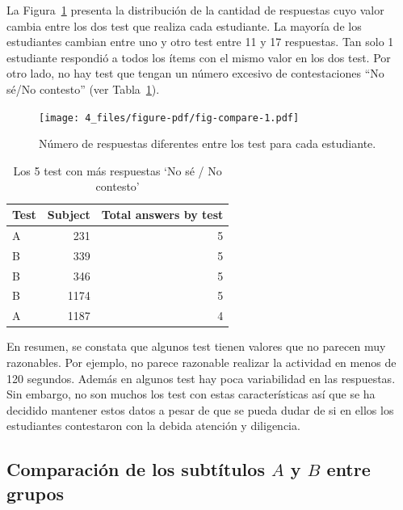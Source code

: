 \documentclass[
  12pt,
  a4paper,
  extrafontsizes,
  onecolumn,
  openright,
  table]{memoir}
\begin{document}
La Figura~\ref{fig-compare} presenta la distribución de la cantidad de
respuestas cuyo valor cambia entre los dos test que realiza cada
estudiante. La mayoría de los estudiantes cambian entre uno y otro test
entre 11 y 17 respuestas. Tan solo 1 estudiante respondió a todos los
ítems con el mismo valor en los dos test. Por otro lado, no hay test que
tengan un número excesivo de contestaciones \enquote{No sé/No contesto}
(ver Tabla~\ref{tbl-noanswer}).

\begin{figure}[h]

{\centering \texttt{[image: 4\_files/figure-pdf/fig-compare-1.pdf]}

}

\caption{\label{fig-compare}Número de respuestas diferentes entre los
test para cada estudiante.}

\end{figure}

\clearpage

\hypertarget{tbl-noanswer}{}
\begin{longtable}{lrr}
\caption{\label{tbl-noanswer}Los 5 test con más respuestas `No sé / No contesto' }\tabularnewline

\toprule
Test & Subject & Total answers by test \\ 
\midrule
A & 231 & 5 \\ 
B & 339 & 5 \\ 
B & 346 & 5 \\ 
B & 1174 & 5 \\ 
A & 1187 & 4 \\ 
\bottomrule
\end{longtable}

En resumen, se constata que algunos test tienen valores que no parecen
muy razonables. Por ejemplo, no parece razonable realizar la actividad
en menos de 120 segundos. Además en algunos test hay poca variabilidad
en las respuestas. Sin embargo, no son muchos los test con estas
características así que se ha decidido mantener estos datos a pesar de
que se pueda dudar de si en ellos los estudiantes contestaron con la
debida atención y diligencia.

\hypertarget{sec-eda-3}{%
\subsection{\texorpdfstring{Comparación de los subtítulos \(A\) y \(B\)
entre
grupos}{Comparación de los subtítulos A y B entre grupos}}\label{sec-eda-3}}
\end{document}
